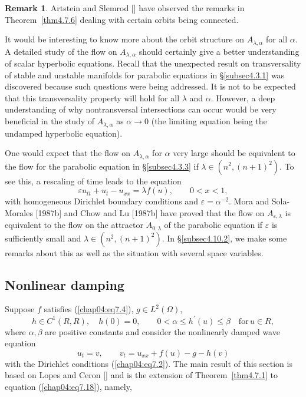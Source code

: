 \documentclass{surv-l}
\theoremstyle{plain}
\theoremstyle{definition}
\newtheorem{remark}[theorem]{Remark}
\numberwithin{equation}{section}
\numberwithin{figure}{chapter}
\begin{document}
\begin{remark}\label{rem4.7.7} Artstein and Slemrod [\citeyear{1982as}] have observed the remarks in Theorem~\ref{thm4.7.6} dealing with certain orbits being connected.

It would be interesting to know more about the orbit structure on $A_{\lambda,\alpha}$ for all $\alpha$. A detailed study of the flow on $A_{\lambda,\alpha}$ should certainly give a better understanding of scalar hyperbolic equations. Recall that the unexpected result on transversality of stable and unstable manifolds for parabolic equations in \S  \ref{subsec4.3.1} was discovered because such questions were being addressed. It is not to be expected that this transversality property will hold for all $\lambda$ and $\alpha$. However, a deep understanding of why nontransversal intersections can occur would be very beneficial in the study of $A_{\lambda,\alpha}$ as $\alpha\rightarrow 0$ (the limiting equation being the undamped hyperbolic equation).

One would expect that the flow on $A_{\lambda,\alpha}$ for $\alpha$ very large should be equivalent to the flow for the parabolic equation in \S  \ref{subsec4.3.3} if $\lambda\in (n^{2}, (n +1)^{2})$. To see this, a rescaling of time leads to the equation
\begin{equation*}
\varepsilon u_{tt}+u_{t}-u_{xx}=\lambda f(u),\quad\quad 0<x<1,
\end{equation*}
with homogeneous Dirichlet boundary conditions and $\varepsilon =\alpha^{-2}$. Mora and Sola-Morales [1987b] and Chow and Lu [1987b] have proved that the flow on $A_{\varepsilon,\lambda}$ is equivalent to the flow on the attractor $A_{0,\lambda}$ of the parabolic equation if $\varepsilon$ is sufficiently small and $\lambda \in(n^{2}, (n+1)^{2})$. In \S \ref{subsec4.10.2}, we make some remarks about this as well as the situation with several space variables.
\end{remark}

\subsection{Nonlinear damping}\label{subsec4.7.3} Suppose $f$ satisfies (\ref{chap04:eq7.4}), $g \in L^{2}(\Omega)$,
\begin{equation}\label{chap04:eq7.17}
h\in C^{1}(R, R),\quad h(0)=0,\quad\quad 0<\alpha\leq h^{\prime}(u)\leq\beta\quad \mathrm{for}\, u\in R,
\end{equation}
where $\alpha, \beta$ are positive constants and consider the nonlinearly damped wave equation
\begin{equation}\label{chap04:eq7.18}
u_{t}=v,\quad\quad v_{t}=u_{xx}+f(u)-g-h(v)
\end{equation}
with the Dirichlet conditions (\ref{chap04:eq7.2}). The main result of this section is based on Lopes and Ceron [\citeyear{1984lc}] and is the extension of Theorem~\ref{thm4.7.1} to equation (\ref{chap04:eq7.18}), namely,
\end{document}
